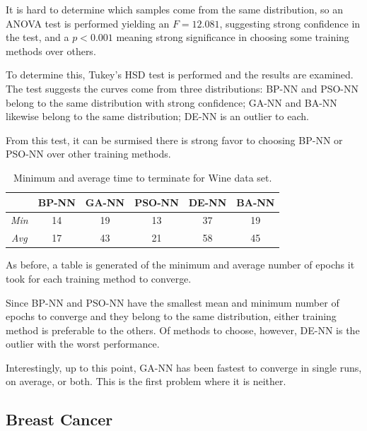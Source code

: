 \documentclass[a4paper,12pt]{article}
\begin{document}
It is hard to determine which samples come from the same distribution, so an ANOVA test is performed yielding an $F = 12.081$, suggesting strong confidence in the test, and a $p < 0.001$ meaning strong significance in choosing some training methods over others.

To determine this, Tukey's HSD test is performed and the results are examined. The test suggests the curves come from three distributions: BP-NN and PSO-NN belong to the same distribution with strong confidence; GA-NN and BA-NN likewise belong to the same distribution; DE-NN is an outlier to each.

From this test, it can be surmised there is strong favor to choosing BP-NN or PSO-NN over other training methods.

\begin{table}[h!]
\centering
\begin{tabular}{c|c|c|c|c|c|}
\cline{2-6}
 & \textbf{BP-NN} & \textbf{GA-NN} & \textbf{PSO-NN} & \textbf{DE-NN} & \textbf{BA-NN} \\ \hline
\multicolumn{1}{|c|}{\textit{Min}} & \cellcolor[HTML]{FFFFFF}14 & \cellcolor[HTML]{FFFFFF}19 & \cellcolor[HTML]{C5F1BF}13 & \cellcolor[HTML]{FFCCC9}37 & \cellcolor[HTML]{FFFFFF}19 \\ \hline
\multicolumn{1}{|c|}{\textit{Avg}} & \cellcolor[HTML]{C5F1BF}17 & \cellcolor[HTML]{FFFFFF}43 & \cellcolor[HTML]{FFFFFF}21 & \cellcolor[HTML]{FFCCC9}58 & \cellcolor[HTML]{FFFFFF}45 \\ \hline
\end{tabular}
\caption{Minimum and average time to terminate for Wine data set.}
\label{Tab:wine-min}
\end{table}

As before, a table is generated of the minimum and average number of epochs it took for each training method to converge.

Since BP-NN and PSO-NN have the smallest mean and minimum number of epochs to converge and they belong to the same distribution, either training method is preferable to the others. Of methods to choose, however, DE-NN is the outlier with the worst performance.

Interestingly, up to this point, GA-NN has been fastest to converge in single runs, on average, or both. This is the first problem where it is neither.

\pagebreak

\subsection{Breast Cancer}
\end{document}
